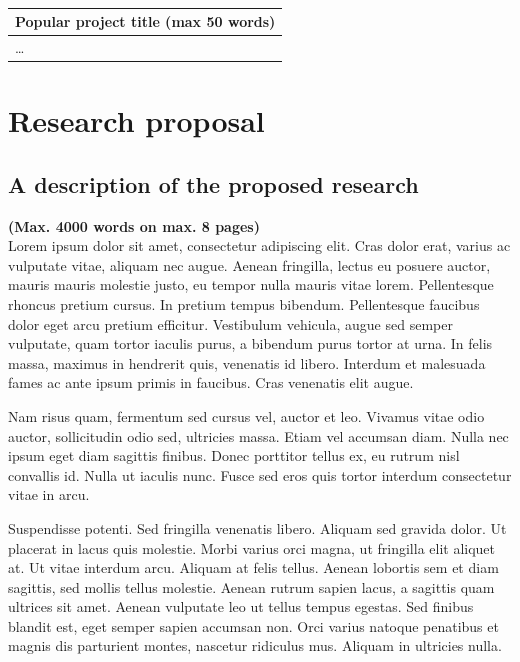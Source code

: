 \documentclass[10pt]{article}
\newcommand{\tableheadfont}{\bfseries\fontsize{10}{10}\selectfont\leavevmode\color{tableblue}}
\begin{document}
	\vspace{6mm}	
	\noindent{\hspace{2mm}\tableheadfont ENG}\\
	\begin{tabularx}{\linewidth}{|X|}
		\hline {\tableheadfont Popular project title (max 50 words)} \\\hline
		\ldots \\\hline
	\end{tabularx}	
		
	\section{Research proposal}
	
	\subsection{A description of the proposed research}
	\vspace{-0.2cm}
	{\bf\hspace{0.8cm} (Max. 4000 words on max. 8 pages)}\\[0.1cm]
	
	\noindent
	Lorem ipsum dolor sit amet, consectetur adipiscing elit. Cras dolor erat, varius ac vulputate vitae, aliquam nec augue. Aenean fringilla, lectus eu posuere auctor, mauris mauris molestie justo, eu tempor nulla mauris vitae lorem. Pellentesque rhoncus pretium cursus. In pretium tempus bibendum. Pellentesque faucibus dolor eget arcu pretium efficitur. Vestibulum vehicula, augue sed semper vulputate, quam tortor iaculis purus, a bibendum purus tortor at urna. In felis massa, maximus in hendrerit quis, venenatis id libero. Interdum et malesuada fames ac ante ipsum primis in faucibus. Cras venenatis elit augue.
	
	Nam risus quam, fermentum sed cursus vel, auctor et leo. Vivamus vitae odio auctor, sollicitudin odio sed, ultricies massa. Etiam vel accumsan diam. Nulla nec ipsum eget diam sagittis finibus. Donec porttitor tellus ex, eu rutrum nisl convallis id. Nulla ut iaculis nunc. Fusce sed eros quis tortor interdum consectetur vitae in arcu.
	
	Suspendisse potenti. Sed fringilla venenatis libero. Aliquam sed gravida dolor. Ut placerat in lacus quis molestie. Morbi varius orci magna, ut fringilla elit aliquet at. Ut vitae interdum arcu. Aliquam at felis tellus. Aenean lobortis sem et diam sagittis, sed mollis tellus molestie. Aenean rutrum sapien lacus, a sagittis quam ultrices sit amet. Aenean vulputate leo ut tellus tempus egestas. Sed finibus blandit est, eget semper sapien accumsan non. Orci varius natoque penatibus et magnis dis parturient montes, nascetur ridiculus mus. Aliquam in ultricies nulla.
	
\end{document}
